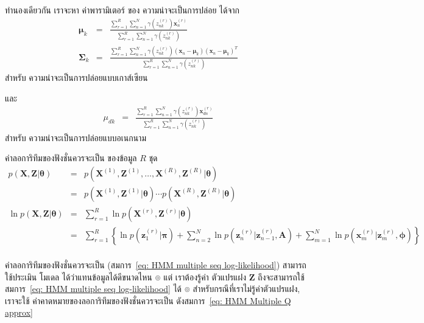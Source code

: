 ทำนองเดียวกัน เราจะหา ค่าพารามิเตอร์ ของ ความน่าจะเป็นการปล่อย ได้จาก
\begin{eqnarray}
\bm{\mu}_k &=& \frac{\sum_{r=1}^R \sum_{n=1}^N \gamma(z_{nk}^{(r)}) \textbf{x}_n^{(r)}}{\sum_{r=1}^R \sum_{n=1}^N \gamma(z_{nk}^{(r)})}
\label{eq: Bishop 13.126} \\
\bm{\Sigma}_k &=& \frac{\sum_{r=1}^R \sum_{n=1}^N \gamma(z_{nk}^{(r)}) (\textbf{x}_n - \bm{\mu}_k) (\textbf{x}_n - \bm{\mu}_k)^T}{\sum_{r=1}^R \sum_{n=1}^N \gamma(z_{nk}^{(r)})}
\end{eqnarray}
สำหรับ ความน่าจะเป็นการปล่อยแบบเกาส์เซียน

และ
\begin{eqnarray}
\mu_{dk} &=& \frac{\sum_{r=1}^R \sum_{n=1}^N \gamma(z_{nk}^{(r)}) \textbf{x}_{dn}^{(r)}}{\sum_{r=1}^R \sum_{n=1}^N \gamma(z_{nk}^{(r)})}
\end{eqnarray}
สำหรับ ความน่าจะเป็นการปล่อยแบบอเนกนาม

ค่าลอการิทึมของฟังชั่นควรจะเป็น ของข้อมูล $R$ ชุด
\begin{eqnarray}
p(\textbf{X}, \textbf{Z}|\bm{\theta}) &=&
p(\textbf{X}^{(1)}, \textbf{Z}^{(1)}, \ldots, \textbf{X}^{(R)}, \textbf{Z}^{(R)}|\bm{\theta})
\nonumber \\
&=& 
p(\textbf{X}^{(1)}, \textbf{Z}^{(1)}|\bm{\theta})  \cdots p(\textbf{X}^{(R)}, \textbf{Z}^{(R)}|\bm{\theta})
\nonumber \\
\ln p(\textbf{X}, \textbf{Z}|\bm{\theta}) 
&=& \sum_{r=1}^R \ln p(\textbf{X}^{(r)}, \textbf{Z}^{(r)}|\bm{\theta})
\nonumber \\
&=& \sum_{r=1}^R \left\{ \ln p(\textbf{z}_1^{(r)}|\bm{\pi}) 
+ \sum_{n=2}^N \ln p(\textbf{z}_n^{(r)}|\textbf{z}_{n-1}^{(r)}, \textbf{A}) 
+ \sum_{m=1}^N \ln p(\textbf{x}_m^{(r)} | \textbf{z}_m^{(r)}, \bm{\phi}) \right\}
\nonumber \\
\label{eq: HMM multiple seq log-likelihood}
\end{eqnarray}

ค่าลอการิทึมของฟังชั่นควรจะเป็น (สมการ~\ref{eq: HMM multiple seq log-likelihood}) สามารถใช้ประเมิน โมเดล ได้ว่าแทนข้อมูลได้ดีขนาดไหน
๏ แต่ เราต้องรู้ค่า ตัวแปรแฝง $\textbf{Z}$ ถึงจะสามารถใช้ สมการ~\ref{eq: HMM multiple seq log-likelihood} ได้
๏ สำหรับกรณีที่เราไม่รู้ค่าตัวแปรแฝง, เราจะใช้ ค่าคาดหมายของลอการิทึมของฟังชั่นควรจะเป็น ดังสมการ~\ref{eq: HMM Multiple Q approx}





